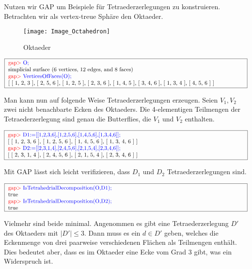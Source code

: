 \documentclass[12pt,titlepage,twoside,cleardoublepage]{article}
\theoremstyle{nummermitklammern}
\numberwithin{equation}{section}
\begin{document}
Nutzen wir GAP um Beispiele für Tetraederzerlegungen zu konstruieren. Betrachten wir als vertex-treue Sphäre den Oktaeder.
\begin{figure}[H]
\begin{center}
\texttt{[image: Image\_Octahedron]}
\end{center}
\caption{Oktaeder}
\end{figure}
\begin{center}
$\fbox{
\parbox{15cm}{
\textcolor{red}{gap$>$} \textcolor{blue}{O;}\newline 
simplicial surface (6 vertices, 12 edges, and 8 faces) \newline
\textcolor{red}{gap$>$} \textcolor{blue}{VerticesOfFaces(O);}\newline
[ [ 1, 2, 3 ], [ 2, 5, 6 ], [ 1, 2, 5 ], [ 2, 3, 6 ], [ 1, 4, 5 ],  [ 3, 4, 6 ], [ 1, 3, 4 ], [ 4, 5, 6 ] ]
}}$
\end{center}
Man kann nun auf folgende Weise Tetraederzerlegungen erzeugen.
Seien $V_1,V_2$ zwei nicht benachbarte Ecken des Oktaeders.
Die 4-elementigen Teilmengen der Tetraederzerlegung sind genau die Butterflies, die $V_1$ und $V_2$ enthalten.
\begin{center}
$\fbox{
\parbox{15cm}{
\textcolor{red}{gap$>$}  \textcolor{blue}{D1:=[[1,2,3,6],[1,2,5,6],[1,4,5,6],[1,3,4,6]];}\newline
[ [ 1, 2, 3, 6 ], [ 1, 2, 5, 6 ], [ 1, 4, 5, 6 ], [ 1, 3, 4, 6 ] ]\newline
\textcolor{red}{gap$>$}  \textcolor{blue}{D2:=[[2,3,1,4],[2,4,5,6],[2,1,5,4],[2,3,4,6]];}\newline
[ [ 2, 3, 1, 4 ], [ 2, 4, 5, 6 ], [ 2, 1, 5, 4 ], [ 2, 3, 4, 6 ] ]
}}$
\end{center}
Mit GAP lässt sich leicht verifizieren, dass $D_1$ und $D_2$  Tetraederzerlegungen sind.
\begin{center}
$\fbox{
\parbox{15cm}{
\textcolor{red}{gap$>$}  \textcolor{blue}{IsTetrahedrialDecomposition(O,D1);}\newline
 true \newline
\textcolor{red}{gap$>$}  \textcolor{blue}{IsTetrahedrialDecomposition(O,D2);}\newline
 true
 }}$ 
 \end{center}
Vielmehr sind beide minimal. Angenommen es gibt eine Tetraederzerlegung $D'$ des Oktaeders mit $\vert D' \vert\leq 3$. Dann muss es ein $d\in D'$ geben, welches die Eckenmenge von drei paarweise verschiedenen Flächen als Teilmengen enthält. Dies bedeutet aber, dass es im Oktaeder eine Ecke vom Grad 3 gibt, was ein Widerspruch ist. 
\end{document}
